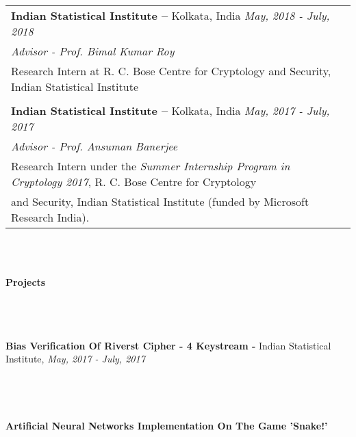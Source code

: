 \documentclass[a4paper,10pt]{article}
\newcommand{\lsep}{-0.5cm}
\newcommand{\resheading}[1]{{\large \colorbox{mygrey}{\begin{minipage}{0.99\textwidth}{\textbf{#1 \vphantom{p\^{E}}}}\end{minipage}}}}
\begin{document}
\indent
\begin{tabular*}{\textwidth}{l@{\extracolsep{\fill}}r}
\textbf{Indian Statistical Institute – } Kolkata, India
\indent\indent\indent\indent\indent\indent\indent\indent\indent\indent\indent\indent\indent\indent\small{\emph{      May, 2018 - July, 2018}}\\
\emph{Advisor - Prof. Bimal Kumar Roy}\\
{Research Intern at R. C. Bose Centre for Cryptology and Security, Indian Statistical Institute}\\\\

\textbf{Indian Statistical Institute – } Kolkata, India
\indent\indent\indent\indent\indent\indent\indent\indent\indent\indent\indent\indent\indent\indent\small{\emph{      May, 2017 - July, 2017}}\\
\emph{Advisor - Prof. Ansuman Banerjee}\\
{Research Intern under the \emph{Summer Internship Program in Cryptology 2017}, R. C. Bose Centre for Cryptology}\\
{and Security, Indian Statistical Institute (funded by Microsoft Research India).}\\

\end{tabular*}\\\\

\resheading{\textbf{Projects} }\\\\[\lsep]

\\\indent\textbf{Bias Verification Of Riverst Cipher - 4 Keystream - }Indian Statistical Institute, \small{\emph{May, 2017 - July, 2017}}\\
\\\\\\

\\\indent\textbf{Artificial Neural Networks Implementation On The Game 'Snake!'}\\
\\\\\\
\end{document}
